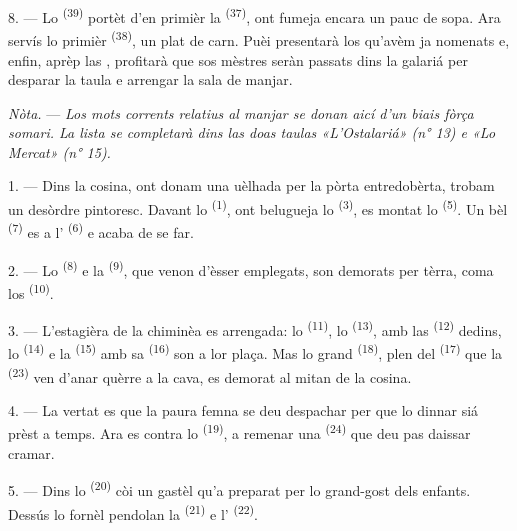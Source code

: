 8. --- Lo  \textsuperscript{(39)} portèt d'en primièr la
 \textsuperscript{(37)}, ont fumeja encara un pauc de sopa. Ara
servís lo primièr  \textsuperscript{(38)}, un plat de carn. Puèi
presentarà los qu'avèm ja nomenats e, enfin, aprèp las ,
profitarà que sos mèstres seràn passats dins la galariá per desparar la taula e
arrengar la sala de manjar.

\textit{Nòta.} --- \textit{Los mots corrents relatius al manjar se donan aicí
d'un biais fòrça somari. La lista se completarà dins las doas taulas «L'Ostalariá»
(n° 13) e «Lo Mercat» (n° 15).}

\VUsaut{4.6mm}
\VUsaut{3.0mm}

1. --- Dins la cosina, ont donam una uèlhada per la pòrta entredobèrta, trobam un
desòrdre pintoresc. Davant lo  \textsuperscript{(1)}, ont
belugueja lo  \textsuperscript{(3)}, es montat lo  \textsuperscript{(5)}. Un bèl  \textsuperscript{(7)} es a
l' \textsuperscript{(6)} e acaba de se far.

2. --- Lo  \textsuperscript{(8)} e la 
\textsuperscript{(9)}, que venon d'èsser emplegats, son demorats per tèrra, coma
los  \textsuperscript{(10)}.

3. --- L'estagièra de la chiminèa es arrengada: lo 
\textsuperscript{(11)}, lo  \textsuperscript{(13)}, amb las
 \textsuperscript{(12)} dedins, lo 
\textsuperscript{(14)} e la  \textsuperscript{(15)} amb sa
 \textsuperscript{(16)} son a lor plaça. Mas lo grand  \textsuperscript{(18)}, plen del 
\textsuperscript{(17)} que la  \textsuperscript{(23)} ven
d'anar quèrre a la cava, es demorat al mitan de la cosina.

4. --- La vertat es que la paura femna se deu despachar per que lo dinnar siá
prèst a temps. Ara es contra lo  \textsuperscript{(19)}, a
remenar una  \textsuperscript{(24)} que deu pas daissar cramar.

5. --- Dins lo  \textsuperscript{(20)} còi un gastèl qu'a preparat
per lo grand-gost dels enfants. Dessús lo fornèl pendolan la  \textsuperscript{(21)} e l' \textsuperscript{(22)}.

